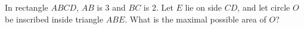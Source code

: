 In rectangle $ABCD$, $AB$ is $3$ and $BC$ is $2$. Let $E$ lie on side $CD$, and let circle $O$ be inscribed inside triangle $ABE$. What is the maximal possible area of $O$?
